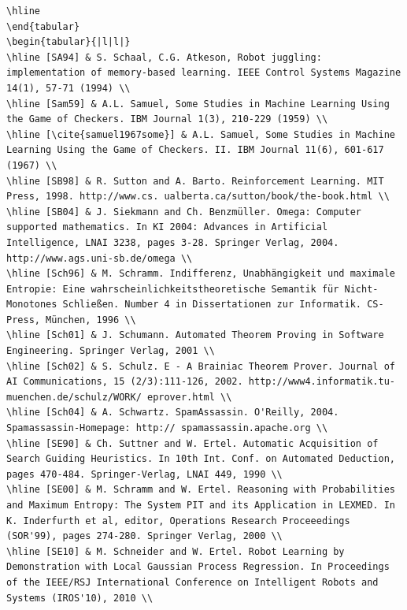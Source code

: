 \documentclass[10pt]{article}
\begin{document}
\begin{verbatim}
\hline
\end{tabular}
\begin{tabular}{|l|l|}
\hline [SA94] & S. Schaal, C.G. Atkeson, Robot juggling: implementation of memory-based learning. IEEE Control Systems Magazine 14(1), 57-71 (1994) \\
\hline [Sam59] & A.L. Samuel, Some Studies in Machine Learning Using the Game of Checkers. IBM Journal 1(3), 210-229 (1959) \\
\hline [\cite{samuel1967some}] & A.L. Samuel, Some Studies in Machine Learning Using the Game of Checkers. II. IBM Journal 11(6), 601-617 (1967) \\
\hline [SB98] & R. Sutton and A. Barto. Reinforcement Learning. MIT Press, 1998. http://www.cs. ualberta.ca/sutton/book/the-book.html \\
\hline [SB04] & J. Siekmann and Ch. Benzmüller. Omega: Computer supported mathematics. In KI 2004: Advances in Artificial Intelligence, LNAI 3238, pages 3-28. Springer Verlag, 2004. http://www.ags.uni-sb.de/omega \\
\hline [Sch96] & M. Schramm. Indifferenz, Unabhängigkeit und maximale Entropie: Eine wahrscheinlichkeitstheoretische Semantik für Nicht-Monotones Schließen. Number 4 in Dissertationen zur Informatik. CS-Press, München, 1996 \\
\hline [Sch01] & J. Schumann. Automated Theorem Proving in Software Engineering. Springer Verlag, 2001 \\
\hline [Sch02] & S. Schulz. E - A Brainiac Theorem Prover. Journal of AI Communications, 15 (2/3):111-126, 2002. http://www4.informatik.tu-muenchen.de/schulz/WORK/ eprover.html \\
\hline [Sch04] & A. Schwartz. SpamAssassin. O'Reilly, 2004. Spamassassin-Homepage: http:// spamassassin.apache.org \\
\hline [SE90] & Ch. Suttner and W. Ertel. Automatic Acquisition of Search Guiding Heuristics. In 10th Int. Conf. on Automated Deduction, pages 470-484. Springer-Verlag, LNAI 449, 1990 \\
\hline [SE00] & M. Schramm and W. Ertel. Reasoning with Probabilities and Maximum Entropy: The System PIT and its Application in LEXMED. In K. Inderfurth et al, editor, Operations Research Proceeedings (SOR'99), pages 274-280. Springer Verlag, 2000 \\
\hline [SE10] & M. Schneider and W. Ertel. Robot Learning by Demonstration with Local Gaussian Process Regression. In Proceedings of the IEEE/RSJ International Conference on Intelligent Robots and Systems (IROS'10), 2010 \\

\end{verbatim}
\end{document}
